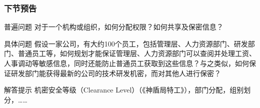 \begin{frame}
  \frametitle{下节预告}
  \begin{block}{普遍问题}
    对于一个机构或组织，如何分配权限？如何共享及保密信息？
  \end{block}
  \pause
  \begin{block}{具体问题}
    假设一家公司，有大约100个员工，包括管理层、人力资源部门、研发部门、普通员工等，如何规划才能保证管理层、人力资源部门可以查阅并处理工资、人事调动等敏感信息，同时还能防止普通员工获取到这些信息？与之类似，如何保证研发部门能获得最新的公司的技术研发机密，而对其他人进行保密？
  \end{block}
  \pause
  \begin{block}{解答提示}
    机密安全等级（Clearance Level）（《神盾局特工》），部门分配，组别划分，……
  \end{block}
\end{frame}




